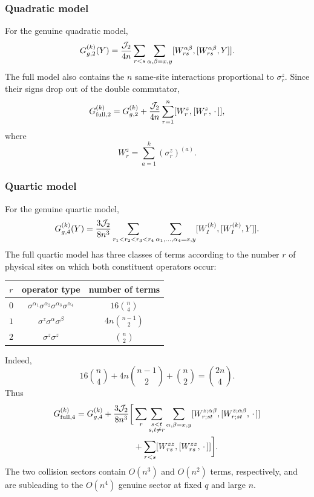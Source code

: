 \documentclass{article}
\theoremstyle{definition}
\begin{document}
\subsubsection{Quadratic model}

For the genuine quadratic model,
\begin{equation}
    G_{g,2}^{(k)}(Y)
    =\frac{{\cal J}_2}{4n}
      \sum_{r<s}\sum_{\alpha,\beta=x,y}
      [W_{rs}^{\alpha\beta},[W_{rs}^{\alpha\beta},Y]].
\end{equation}
The full model also contains the $n$ same-site interactions proportional to
$\sigma_r^z$.  Since their signs drop out of the double commutator,
\begin{equation}
    G_{{\rm full},2}^{(k)}
    =G_{g,2}^{(k)}
     +\frac{{\cal J}_2}{4n}
      \sum_{r=1}^n[W_r^z,[W_r^z,\,\cdot\,]],
\end{equation}
where
\begin{equation}
    W_r^z=\sum_{a=1}^k(\sigma_r^z)^{(a)}.
\end{equation}

\subsubsection{Quartic model}

For the genuine quartic model,
\begin{equation}
    G_{g,4}^{(k)}(Y)
    =\frac{3{\cal J}_2}{8n^3}
      \sum_{r_1<r_2<r_3<r_4}
      \sum_{\alpha_1,\ldots,\alpha_4=x,y}
      [W_I^{(k)},[W_I^{(k)},Y]].
\end{equation}
The full quartic model has three classes of terms according to the number
$r$ of physical sites on which both constituent operators occur:
\begin{center}
\begin{tabular}{c|c|c}
$r$ & operator type & number of terms \\
\hline
$0$ & $\sigma^{\alpha_1}\sigma^{\alpha_2}
       \sigma^{\alpha_3}\sigma^{\alpha_4}$
    & $16\binom n4$ \\
$1$ & $\sigma^z\sigma^\alpha\sigma^\beta$
    & $4n\binom{n-1}{2}$ \\
$2$ & $\sigma^z\sigma^z$
    & $\binom n2$
\end{tabular}
\end{center}
Indeed,
\begin{equation}
    16\binom n4+4n\binom{n-1}{2}+\binom n2=\binom{2n}{4}.
\end{equation}
Thus
\begin{align}
    G_{{\rm full},4}^{(k)}
    =G_{g,4}^{(k)}
    +\frac{3{\cal J}_2}{8n^3}
    \bigg[&
      \sum_r\sum_{\substack{s<t\\s,t\neq r}}
      \sum_{\alpha,\beta=x,y}
      [W_{r;st}^{z;\alpha\beta},
       [W_{r;st}^{z;\alpha\beta},\,\cdot\,]]
      \nonumber\\
      &+\sum_{r<s}[W_{rs}^{zz},[W_{rs}^{zz},\,\cdot\,]]
    \bigg].
\end{align}
The two collision sectors contain $O(n^3)$ and $O(n^2)$ terms,
respectively, and are subleading to the $O(n^4)$ genuine sector at fixed
$q$ and large $n$.
\end{document}
